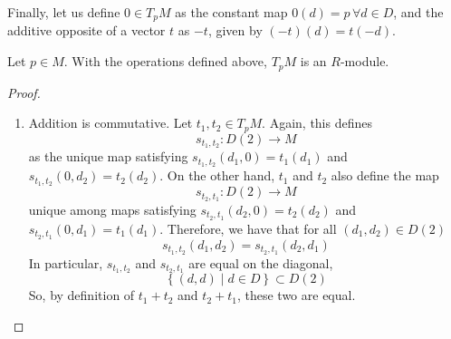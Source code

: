 Finally, let us define \( 0\in T_pM \) as the constant map \( 0(d)=p \,\forall d\in D \), and the additive opposite of a vector \( t \) as \( -t \), given by \( (-t)(d) = t(-d) \).

\begin{proposition}
  Let \( p\in M \). With the operations defined above, \( T_pM \) is an \( R \)-module.
\end{proposition}

\begin{proof}
  \begin{enumerate}
    \item Addition is commutative. Let \( t_1,t_2\in T_pM \). Again, this defines
      \begin{equation*}
	s_{t_1,t_2}:D(2)\to M
      \end{equation*}
      as the unique map satisfying \( s_{t_1,t_2}(d_1,0) = t_1(d_1) \) and \( s_{t_1,t_2}(0,d_2) = t_2(d_2) \). On the other hand, \( t_1 \) and \( t_2 \) also define the map
      \begin{equation*}
	s_{t_2,t_1}:D(2)\to M
      \end{equation*}
      unique among maps satisfying \( s_{t_2,t_1}(d_2,0) = t_2(d_2) \) and \( s_{t_2,t_1}(0,d_1) = t_1(d_1) \). Therefore, we have that for all \( (d_1,d_2)\in D(2) \)
      \begin{equation*}
	s_{t_1,t_2}(d_1,d_2) = s_{t_2,t_1}(d_2,d_1)
      \end{equation*}
      In particular, \( s_{t_1,t_2} \) and \( s_{t_2,t_1} \) are equal on the diagonal, 
      \begin{equation*}
        \left\{ (d,d)\mid d\in D \right\}\subset D(2)
      \end{equation*}
      So, by definition of \( t_1+t_2 \) and \( t_2+t_1 \), these two are equal.


\end{enumerate}
\end{proof}
